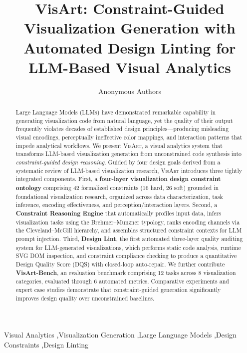 \documentclass[final,5p,times,twocolumn]{elsarticle}
\newcommand{\sysname}{\textsc{VisArt}}
\begin{document}
\begin{frontmatter}

\title{%
  VisArt: Constraint-Guided Visualization Generation with \\
  Automated Design Linting for LLM-Based Visual Analytics%
}

\author{Anonymous Authors}

\begin{abstract}
Large Language Models (LLMs) have demonstrated remarkable capability in generating visualization code from natural language, yet the quality of their output frequently violates decades of established design principles---producing misleading visual encodings, perceptually ineffective color mappings, and interaction patterns that impede analytical workflows.
We present \sysname{}, a visual analytics system that transforms LLM-based visualization generation from unconstrained code synthesis into \textit{constraint-guided design reasoning}.
Guided by four design goals derived from a systematic review of LLM-based visualization research, \sysname{} introduces three tightly integrated components.
First, a \textbf{four-layer visualization design constraint ontology} comprising 42 formalized constraints (16 hard, 26 soft) grounded in foundational visualization research, organized across data characterization, task inference, encoding effectiveness, and perception/interaction layers.
Second, a \textbf{Constraint Reasoning Engine} that automatically profiles input data, infers visualization tasks using the Brehmer--Munzner typology, ranks encoding channels via the Cleveland--McGill hierarchy, and assembles structured constraint contexts for LLM prompt injection.
Third, \textbf{Design Lint}, the first automated three-layer quality auditing system for LLM-generated visualizations, which performs static code analysis, runtime SVG DOM inspection, and constraint compliance checking to produce a quantitative Design Quality Score (DQS) with closed-loop auto-repair.
We further contribute \textbf{VisArt-Bench}, an evaluation benchmark comprising 12 tasks across 8 visualization categories, evaluated through 6 automated metrics.
Comparative experiments and expert case studies demonstrate that constraint-guided generation significantly improves design quality over unconstrained baselines.
\end{abstract}

\begin{keyword}
Visual Analytics \sep Visualization Generation \sep Large Language Models \sep Design Constraints \sep Design Linting
\end{keyword}

\end{frontmatter}
\end{document}
